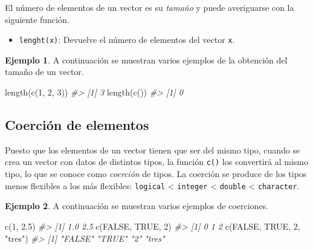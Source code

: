 \documentclass[
]{book}
\newenvironment{Shaded}{\begin{snugshade}}{\end{snugshade}}
\newcommand{\CommentTok}[1]{\textcolor[rgb]{0.56,0.35,0.01}{\textit{#1}}}
\newcommand{\ConstantTok}[1]{\textcolor[rgb]{0.00,0.00,0.00}{#1}}
\newcommand{\DecValTok}[1]{\textcolor[rgb]{0.00,0.00,0.81}{#1}}
\newcommand{\FloatTok}[1]{\textcolor[rgb]{0.00,0.00,0.81}{#1}}
\newcommand{\FunctionTok}[1]{\textcolor[rgb]{0.00,0.00,0.00}{#1}}
\newcommand{\NormalTok}[1]{#1}
\newcommand{\StringTok}[1]{\textcolor[rgb]{0.31,0.60,0.02}{#1}}
\providecommand{\tightlist}{%
  \setlength{\itemsep}{0pt}\setlength{\parskip}{0pt}}
\theoremstyle{definition}
\theoremstyle{definition}
\newtheorem{example}{Ejemplo}[chapter]
\theoremstyle{definition}
\theoremstyle{definition}
\theoremstyle{remark}
\begin{document}
El número de elementos de un vector es su \emph{tamaño} y puede averiguarse con la siguiente función.

\begin{itemize}
\tightlist
\item
  \texttt{lenght(x)}: Devuelve el número de elementos del vector \texttt{x}.
\end{itemize}

\begin{example}

A continuación se muestran varios ejemplos de la obtención del tamaño de un vector.

\begin{Shaded}
\begin{Highlighting}[]
\FunctionTok{length}\NormalTok{(}\FunctionTok{c}\NormalTok{(}\DecValTok{1}\NormalTok{, }\DecValTok{2}\NormalTok{, }\DecValTok{3}\NormalTok{))}
\CommentTok{\#\textgreater{} [1] 3}
\FunctionTok{length}\NormalTok{(}\FunctionTok{c}\NormalTok{())}
\CommentTok{\#\textgreater{} [1] 0}
\end{Highlighting}
\end{Shaded}

\end{example}

\hypertarget{coerciuxf3n-de-elementos}{%
\subsection{Coerción de elementos}\label{coerciuxf3n-de-elementos}}

Puesto que los elementos de un vector tienen que ser del mismo tipo, cuando se crea un vector con datos de distintos tipos, la función \texttt{c()} los convertirá al mismo tipo, lo que se conoce como \emph{coerción} de tipos. La coerción se produce de los tipos menos flexibles a los más flexibles: \texttt{logical} \textless{} \texttt{integer} \textless{} \texttt{double} \textless{} \texttt{character}.

\begin{example}

A continuación se muestran varios ejemplos de coerciones.

\begin{Shaded}
\begin{Highlighting}[]
\FunctionTok{c}\NormalTok{(}\DecValTok{1}\NormalTok{, }\FloatTok{2.5}\NormalTok{)}
\CommentTok{\#\textgreater{} [1] 1.0 2.5}
\FunctionTok{c}\NormalTok{(}\ConstantTok{FALSE}\NormalTok{, }\ConstantTok{TRUE}\NormalTok{, }\DecValTok{2}\NormalTok{)}
\CommentTok{\#\textgreater{} [1] 0 1 2}
\FunctionTok{c}\NormalTok{(}\ConstantTok{FALSE}\NormalTok{, }\ConstantTok{TRUE}\NormalTok{, }\DecValTok{2}\NormalTok{, }\StringTok{"tres"}\NormalTok{)}
\CommentTok{\#\textgreater{} [1] "FALSE" "TRUE"  "2"     "tres"}
\end{Highlighting}
\end{Shaded}

\end{example}
\end{document}
